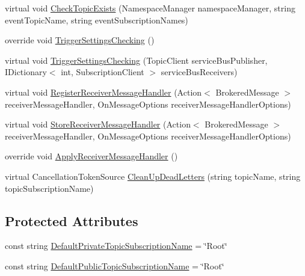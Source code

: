 \begin{DoxyCompactItemize}
virtual void \hyperlink{classCqrs_1_1Azure_1_1ServiceBus_1_1AzureServiceBus_ae330bdb4454bfb9d1594f11df577da3a}{Check\+Topic\+Exists} (Namespace\+Manager namespace\+Manager, string event\+Topic\+Name, string event\+Subscription\+Names)
\item 
override void \hyperlink{classCqrs_1_1Azure_1_1ServiceBus_1_1AzureServiceBus_ae4b736019e332a81eb08d3696f8b6e7e}{Trigger\+Settings\+Checking} ()
\item 
virtual void \hyperlink{classCqrs_1_1Azure_1_1ServiceBus_1_1AzureServiceBus_a31ea4f3f8f5acea0225909611097297e}{Trigger\+Settings\+Checking} (Topic\+Client service\+Bus\+Publisher, I\+Dictionary$<$ int, Subscription\+Client $>$ service\+Bus\+Receivers)
\item 
virtual void \hyperlink{classCqrs_1_1Azure_1_1ServiceBus_1_1AzureServiceBus_ad19764cc41efba37d6a8d96f8a58f906}{Register\+Receiver\+Message\+Handler} (Action$<$ Brokered\+Message $>$ receiver\+Message\+Handler, On\+Message\+Options receiver\+Message\+Handler\+Options)
\item 
virtual void \hyperlink{classCqrs_1_1Azure_1_1ServiceBus_1_1AzureServiceBus_adae5c09b9b3123bd998e99b5b76e21e2}{Store\+Receiver\+Message\+Handler} (Action$<$ Brokered\+Message $>$ receiver\+Message\+Handler, On\+Message\+Options receiver\+Message\+Handler\+Options)
\item 
override void \hyperlink{classCqrs_1_1Azure_1_1ServiceBus_1_1AzureServiceBus_a6ea94560e02fce0d920c467062f5fc98}{Apply\+Receiver\+Message\+Handler} ()
\item 
virtual Cancellation\+Token\+Source \hyperlink{classCqrs_1_1Azure_1_1ServiceBus_1_1AzureServiceBus_a8d1d5833d49b7793933825f2a13fb8b7}{Clean\+Up\+Dead\+Letters} (string topic\+Name, string topic\+Subscription\+Name)
\end{DoxyCompactItemize}
\subsection*{Protected Attributes}
\begin{DoxyCompactItemize}
\item 
const string \hyperlink{classCqrs_1_1Azure_1_1ServiceBus_1_1AzureServiceBus_adbfdf69ded51320d81fce8e652af9b88}{Default\+Private\+Topic\+Subscription\+Name} = \char`\"{}Root\char`\"{}
\item 
const string \hyperlink{classCqrs_1_1Azure_1_1ServiceBus_1_1AzureServiceBus_a278db23f67223fbb25455038c7fa1ebf}{Default\+Public\+Topic\+Subscription\+Name} = \char`\"{}Root\char`\"{}
\end{DoxyCompactItemize}
